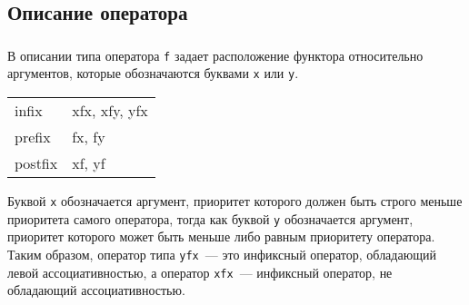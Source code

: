 \subsection{Описание оператора}



\begin{frame}

	\frametitle{\insertsection}
	\framesubtitle{\insertsubsection}
	
	В описании типа оператора \texttt{f} задает расположение функтора относительно аргументов, которые обозначаются буквами \texttt{x} или \texttt{y}.
	
	\begin{table}
		\centering
		\begin{tabular}{ l l }
			\rowcolor{LightGray} infix & xfx, xfy, yfx \\
			\rowcolor{LightGray} prefix & fx, fy \\
			\rowcolor{LightGray} postfix & xf, yf \\
		\end{tabular}
	\end{table}

	Буквой \texttt{x} обозначается аргумент, приоритет которого должен быть строго меньше приоритета самого оператора, тогда как буквой \texttt{y} обозначается аргумент, приоритет которого может быть меньше либо равным приоритету оператора. Таким образом, оператор типа \texttt{yfx}~--- это инфиксный оператор, обладающий левой ассоциативностью, а оператор \texttt{xfx}~--- инфиксный оператор, не обладающий ассоциативностью.

\end{frame}


